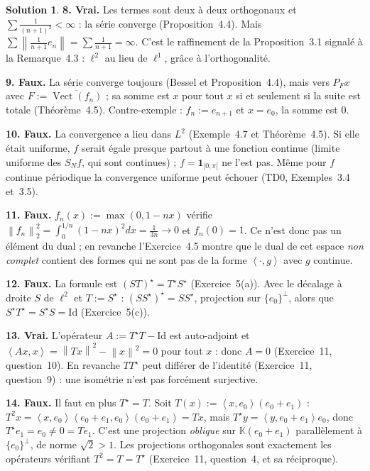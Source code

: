 \documentclass[11pt,a4paper]{article}
\newcommand{\K}{\mathbb{K}}
\newcommand{\adh}[1]{\overline{#1}}
\newcommand{\Vect}{\operatorname{Vect}}
\newcommand{\norm}[1]{\left\|#1\right\|}
\newcommand{\ps}[2]{\left\langle #1,#2\right\rangle}
\theoremstyle{definition}
\newtheorem*{solution}{Solution}
\begin{document}
\begin{solution}
\medskip
\noindent\textbf{8. Vrai.} Les termes sont deux à deux orthogonaux et $\sum\frac1{(n+1)^2}<\infty$ : la série converge (Proposition~4.4). Mais $\sum\norm{\frac1{n+1}e_n}=\sum\frac1{n+1}=\infty$. C'est le raffinement de la Proposition~3.1 signalé à la Remarque~4.3 : $\ell^2$ au lieu de $\ell^1$, grâce à l'orthogonalité.

\medskip
\noindent\textbf{9. Faux.} La série converge toujours (Bessel et Proposition~4.4), mais vers $P_Fx$ avec $F:=\adh{\Vect(f_n)}$ ; sa somme est $x$ pour tout $x$ si et seulement si la suite est totale (Théorème~4.5). Contre-exemple : $f_n:=e_{n+1}$ et $x=e_0$, la somme est $0$.

\medskip
\noindent\textbf{10. Faux.} La convergence a lieu dans $L^2$ (Exemple~4.7 et Théorème~4.5). Si elle était uniforme, $f$ serait égale presque partout à une fonction continue (limite uniforme des $S_Nf$, qui sont continues) ; $f=\mathbf 1_{]0,\pi[}$ ne l'est pas. Même pour $f$ continue périodique la convergence uniforme peut échouer (TD0, Exemples~3.4 et~3.5).

\medskip
\noindent\textbf{11. Faux.} $f_n(x):=\max(0,1-nx)$ vérifie $\norm{f_n}_2^2=\int_0^{1/n}(1-nx)^2dx=\frac1{3n}\to0$ et $f_n(0)=1$. Ce n'est donc pas un élément du dual ; en revanche l'Exercice~4.5 montre que le dual de cet espace \emph{non complet} contient des formes qui ne sont pas de la forme $\ps\cdot g$ avec $g$ continue.

\medskip
\noindent\textbf{12. Faux.} La formule est $(ST)^\star=T^\star S^\star$ (Exercice~5(a)). Avec le décalage à droite $S$ de $\ell^2$ et $T:=S^\star$ : $(SS^\star)^\star=SS^\star$, projection sur $\{e_0\}^\perp$, alors que $S^\star T^\star=S^\star S=\mathrm{Id}$ (Exercice~5(c)).

\medskip
\noindent\textbf{13. Vrai.} L'opérateur $A:=T^\star T-\mathrm{Id}$ est auto-adjoint et $\ps{Ax}x=\norm{Tx}^2-\norm x^2=0$ pour tout $x$ : donc $A=0$ (Exercice~11, question~10). En revanche $TT^\star$ peut différer de l'identité (Exercice~11, question~9) : une isométrie n'est pas forcément surjective.

\medskip
\noindent\textbf{14. Faux.} Il faut en plus $T^\star=T$. Soit $T(x):=\ps x{e_0}(e_0+e_1)$ : $T^2x=\ps x{e_0}\ps{e_0+e_1}{e_0}(e_0+e_1)=Tx$, mais $T^\star y=\ps y{e_0+e_1}e_0$, donc $T^\star e_1=e_0\ne0=Te_1$. C'est une projection \emph{oblique} sur $\K(e_0+e_1)$ parallèlement à $\{e_0\}^\perp$, de norme $\sqrt2>1$. Les projections orthogonales sont exactement les opérateurs vérifiant $T^2=T=T^\star$ (Exercice~11, question~4, et sa réciproque).


\end{solution}
\end{document}
